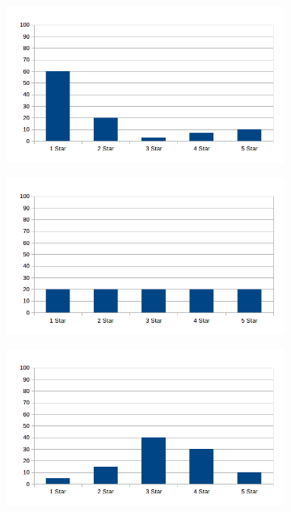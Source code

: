\documentclass[a4paper,10pt]{article}
\begin{document}
\begin{figure}[H]
\centering
\begin{subfigure}{.24\textwidth}
  \centering
  \includegraphics[width=1\linewidth]{4reviewers/neg.png}
  \label{fig:sub1}
\end{subfigure}%
\begin{subfigure}{.24\textwidth}
  \centering
  \includegraphics[width=1\linewidth]{4reviewers/uniform.png}
  \label{fig:sub2}
\end{subfigure}
\begin{subfigure}{.24\textwidth}
  \centering
  \includegraphics[width=1\linewidth]{4reviewers/norm.png}

\end{subfigure}
\end{figure}
\end{document}
